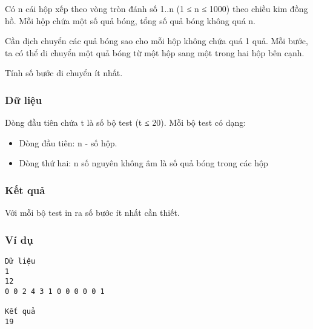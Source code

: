 



   Có n cái hộp xếp theo vòng tròn đánh số 1..n (1 ≤ n ≤ 1000) theo chiều kim đồng hồ. Mỗi hộp chứa một số quả bóng, tổng số quả bóng không quá n.  

   Cần dịch chuyển các quả bóng sao cho mỗi hộp không chứa quá 1 quả. Mỗi bước, ta có thể di chuyển một quả bóng từ một hộp sang một trong hai hộp bên cạnh.  

   Tính số bước di chuyển ít nhất.  

\subsubsection{   Dữ liệu  }

   Dòng đầu tiên chứa t là số bộ test (t ≤ 20). Mỗi bộ test có dạng:  
\begin{itemize}
	\item     Dòng đầu tiên: n - số hộp.    


	\item     Dòng thứ hai: n số nguyên không âm là số quả bóng trong các hộp   
\end{itemize}

\subsubsection{   Kết quả  }

   Với mỗi bộ test in ra số bước ít nhất cần thiết.  

\subsubsection{   Ví dụ  }
\begin{verbatim}
Dữ liệu
1
12
0 0 2 4 3 1 0 0 0 0 0 1

Kết quả
19
\end{verbatim}